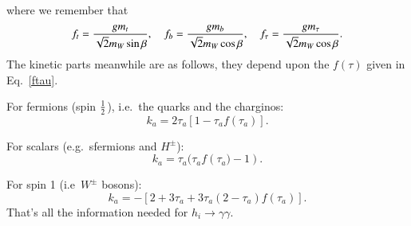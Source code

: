 \documentclass[final,3p,times]{elsarticle}
\begin{document}
where we remember that
\begin{equation}
f_{t} = {g m_{t} \over \sqrt{2} m_{W} \sin\beta}, \quad \quad \\
f_{b} = {g m_{b} \over \sqrt{2} m_{W} \cos\beta}, \quad \quad \\
f_{\tau} = {g m_{\tau} \over \sqrt{2} m_{W} \cos\beta}. \\
\end{equation}
The kinetic parts meanwhile are as follows, they depend upon the $f({\tau})$ given in Eq.~\eqref{ftau}.

For fermions (spin ${1 \over 2}$), i.e.\ the quarks and the charginos:
\begin{equation}
k_{a} = 2 \tau_{a} [1-\tau_{a} f({\tau_{a}})].
\end{equation}

For scalars (e.g.\ sfermions and $H^{\pm}$):
\begin{equation}
k_{a} = \tau_{a} (\tau_{a} f({\tau_{a}) - 1}).
\end{equation}

For spin 1 (i.e\ $W^\pm$ bosons):
\begin{equation}
k_{a} = -[2 + 3\tau_{a} + 3\tau_{a}(2-\tau_{a})f({\tau_{a}})].
\end{equation}
That's all the information needed for $h_{i} \rightarrow \gamma \gamma$.
\end{document}
